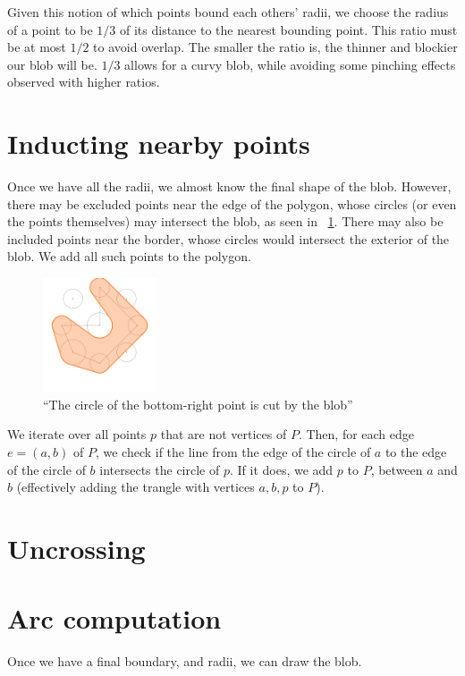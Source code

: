 \documentclass[paper=a4, fontsize=11pt]{scrartcl} %
\numberwithin{equation}{section} %
\numberwithin{figure}{section} %
\numberwithin{table}{section} %
\begin{document}
Given this notion of which points bound each others' radii, we choose the radius
of a point to be $1/3$ of its distance to the nearest bounding point. This
ratio must be at most $1/2$ to avoid overlap. The smaller the ratio is, the
thinner and blockier our blob will be. $1/3$ allows for a curvy blob, while
avoiding some pinching effects observed with higher ratios.

\section{Inducting nearby points}
Once we have all the radii, we almost know the final shape of the blob. However,
there may be excluded points near the edge of the polygon, whose circles (or
even the points themselves) may intersect the blob, as seen in
~\ref{fig:whyrefine}. There may also be included points near the border, whose
circles would intersect the exterior of the blob.  We add all such points to the
polygon.

\begin{figure}[h]
\includegraphics[width=0.3\textwidth]{whyrefine}
\centering
\caption{``The circle of the bottom-right point is cut by the blob''}
\label{fig:whyrefine}
\end{figure}

We iterate over all points $p$ that are not vertices of $P$. Then, for each edge
$e = (a,b)$ of $P$, we check if the line from the edge of the circle of $a$ to
the edge of the circle of $b$ intersects the circle of $p$. If it does, we add
$p$ to $P$, between $a$ and $b$ (effectively adding the trangle with vertices
$a,b,p$ to $P$). \\


\section{Uncrossing}

\section{Arc computation}
Once we have a final boundary, and radii, we can draw the blob.
\end{document}

